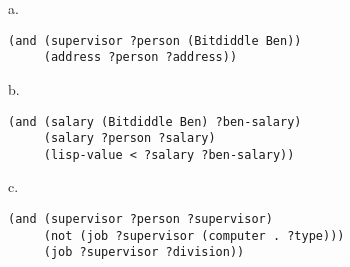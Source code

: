 \documentclass[a4paper,12pt]{article}
\newcommand{\subpar}[1]{\medskip \noindent #1.}
\begin{document}
\subpar{a}
\begin{lstlisting}
(and (supervisor ?person (Bitdiddle Ben))
     (address ?person ?address))
\end{lstlisting}


\subpar{b}
\begin{lstlisting}
(and (salary (Bitdiddle Ben) ?ben-salary)
     (salary ?person ?salary)
     (lisp-value < ?salary ?ben-salary))
\end{lstlisting}

\subpar{c}
\begin{lstlisting}
(and (supervisor ?person ?supervisor)
     (not (job ?supervisor (computer . ?type)))
     (job ?supervisor ?division))
\end{lstlisting}
\end{document}
